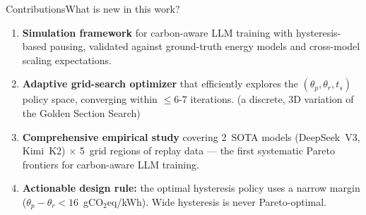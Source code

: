 \begin{frame}[t]{Contributions}{What is new in this work?}

  \begin{enumerate}
    \item \textbf{Simulation framework} for carbon-aware LLM training with
      hysteresis-based pausing, validated against ground-truth energy models
      and cross-model scaling expectations.

      \vspace{0.2cm}
    \item \textbf{Adaptive grid-search optimizer} that efficiently
      explores the $(\theta_p, \theta_r, t_s)$ policy space,
      converging within $\leq$6-7 iterations. (a discrete, 3D
      variation of the Golden Section Search)

      \vspace{0.2cm}
    \item \textbf{Comprehensive empirical study} covering 2~SOTA models
      (DeepSeek~V3, Kimi~K2) $\times$ 5~grid regions of replay data
      --- the first systematic Pareto frontiers for carbon-aware LLM training.

      \vspace{0.2cm}
    \item \textbf{Actionable design rule:} the optimal hysteresis policy uses a
      narrow margin ($\theta_p - \theta_r < 16$~gCO$_2$eq/kWh).
      Wide hysteresis is never Pareto-optimal.
  \end{enumerate}

\end{frame}
